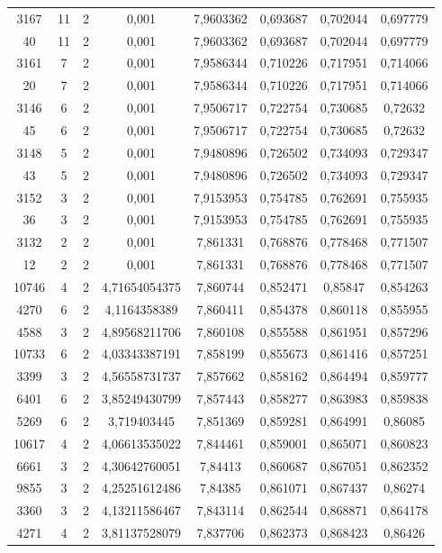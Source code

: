 \begin{longtable}{|c|c|c|c|c|c|c|c|}
3167 & 11 & 2 & 0,001 & 7,9603362 & 0,693687 & 0,702044 & 0,697779 \\
40 & 11 & 2 & 0,001 & 7,9603362 & 0,693687 & 0,702044 & 0,697779 \\
3161 & 7 & 2 & 0,001 & 7,9586344 & 0,710226 & 0,717951 & 0,714066 \\
20 & 7 & 2 & 0,001 & 7,9586344 & 0,710226 & 0,717951 & 0,714066 \\
3146 & 6 & 2 & 0,001 & 7,9506717 & 0,722754 & 0,730685 & 0,72632 \\
45 & 6 & 2 & 0,001 & 7,9506717 & 0,722754 & 0,730685 & 0,72632 \\
3148 & 5 & 2 & 0,001 & 7,9480896 & 0,726502 & 0,734093 & 0,729347 \\
43 & 5 & 2 & 0,001 & 7,9480896 & 0,726502 & 0,734093 & 0,729347 \\
3152 & 3 & 2 & 0,001 & 7,9153953 & 0,754785 & 0,762691 & 0,755935 \\
36 & 3 & 2 & 0,001 & 7,9153953 & 0,754785 & 0,762691 & 0,755935 \\
3132 & 2 & 2 & 0,001 & 7,861331 & 0,768876 & 0,778468 & 0,771507 \\
12 & 2 & 2 & 0,001 & 7,861331 & 0,768876 & 0,778468 & 0,771507 \\
10746 & 4 & 2 & 4,71654054375 & 7,860744 & 0,852471 & 0,85847 & 0,854263 \\
4270 & 6 & 2 & 4,1164358389 & 7,860411 & 0,854378 & 0,860118 & 0,855955 \\
4588 & 3 & 2 & 4,89568211706 & 7,860108 & 0,855588 & 0,861951 & 0,857296 \\
10733 & 6 & 2 & 4,03343387191 & 7,858199 & 0,855673 & 0,861416 & 0,857251 \\
3399 & 3 & 2 & 4,56558731737 & 7,857662 & 0,858162 & 0,864494 & 0,859777 \\
6401 & 6 & 2 & 3,85249430799 & 7,857443 & 0,858277 & 0,863983 & 0,859838 \\
5269 & 6 & 2 & 3,719403445 & 7,851369 & 0,859281 & 0,864991 & 0,86085 \\
10617 & 4 & 2 & 4,06613535022 & 7,844461 & 0,859001 & 0,865071 & 0,860823 \\
6661 & 3 & 2 & 4,30642760051 & 7,84413 & 0,860687 & 0,867051 & 0,862352 \\
9855 & 3 & 2 & 4,25251612486 & 7,84385 & 0,861071 & 0,867437 & 0,86274 \\
3360 & 3 & 2 & 4,13211586467 & 7,843114 & 0,862544 & 0,868871 & 0,864178 \\
4271 & 4 & 2 & 3,81137528079 & 7,837706 & 0,862373 & 0,868423 & 0,86426 \\

\end{longtable}
